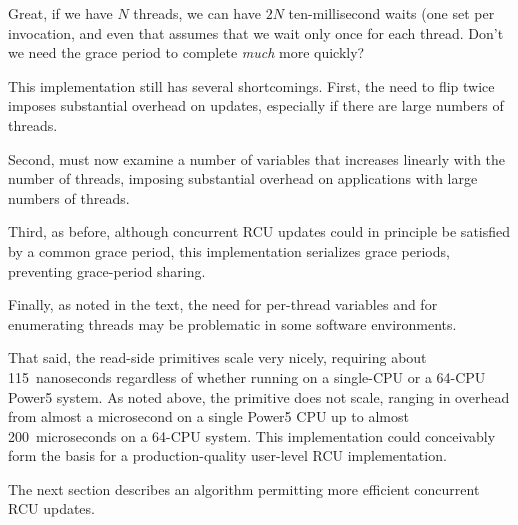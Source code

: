\QuickQuiz{}
	Great, if we have $N$ threads, we can have $2N$ ten-millisecond
	waits (one set per  invocation,
	and even that assumes that we wait only once for each thread.
	Don't we need the grace period to complete \emph{much} more quickly?
 \QuickQuizEnd

This implementation still has several shortcomings.
First, the need to flip  twice imposes substantial overhead
on updates, especially if there are large numbers of threads.

Second,  must now examine a number of variables
that increases linearly with the number of threads, imposing substantial
overhead on applications with large numbers of threads.

Third, as before, although concurrent RCU updates could in principle
be satisfied by a common grace period, this implementation serializes
grace periods, preventing grace-period sharing.

Finally, as noted in the text, the need for per-thread variables
and for enumerating threads may be problematic in some software
environments.

That said, the read-side primitives scale very nicely, requiring about
115~nanoseconds regardless of whether running on a single-CPU or a 64-CPU
Power5 system.
As noted above, the  primitive does not scale,
ranging in overhead from almost a microsecond on a single Power5 CPU
up to almost 200~microseconds on a 64-CPU system.
This implementation could conceivably form the basis for a
production-quality user-level RCU implementation.

The next section describes an algorithm permitting more efficient
concurrent RCU updates.

